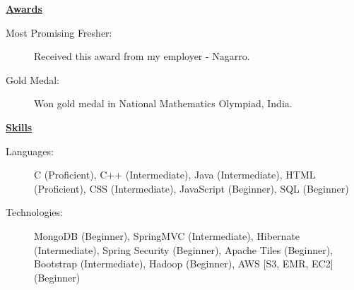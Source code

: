 \documentclass[letterpaper,11pt]{article}
\newcommand{\resheading}[1]{{\large \colorbox{mygrey}{\begin{minipage}{\textwidth}{\textbf{#1 \vphantom{p\^{E}}}}\end{minipage}}}\vspace{6pt}}
\begin{document}
\resheading{\href{http://www.ashish-jindal.com/}{Awards}}

\begin{description}
\item[Most Promising Fresher:] { \footnotesize Received this award from my employer - Nagarro.}
\item[Gold Medal:] { \footnotesize Won gold medal in National Mathematics Olympiad, India.}

\end{description}

\resheading{\href{http://www.ashish-jindal.com/}{Skills}}
	\begin{description}
		\item[Languages:] { \footnotesize C (Proficient), C++ (Intermediate), Java (Intermediate), HTML (Proficient), CSS (Intermediate), JavaScript (Beginner), SQL (Beginner)
		}
		\item[Technologies:] { \footnotesize
			MongoDB (Beginner), SpringMVC (Intermediate), Hibernate (Intermediate), Spring Security (Beginner), Apache Tiles (Beginner), Bootstrap (Intermediate), Hadoop (Beginner), AWS [S3, EMR, EC2] (Beginner)
		}

	\end{description} %
\end{document}

